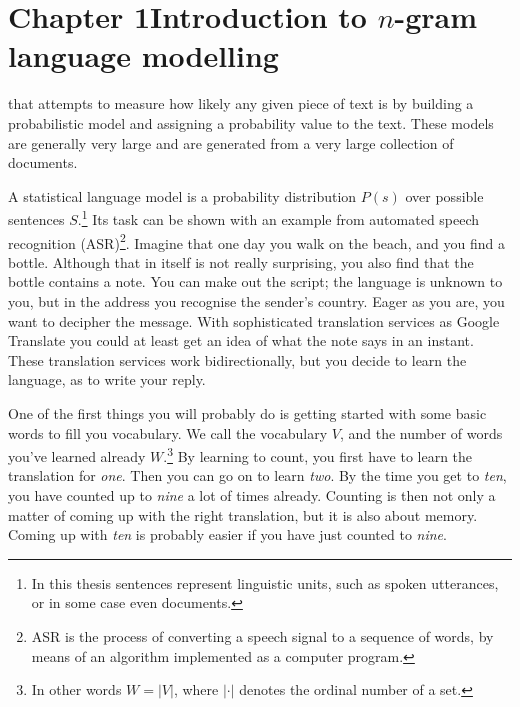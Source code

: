 \chapter{Chapter 1\newline Introduction to $n$-gram language modelling}\label{chap:introlm}

 that attempts to measure how likely any given piece of text is by building a probabilistic model and assigning a probability value to the text. These models are generally very large and are generated from a very large collection of documents.

A statistical language model is a probability distribution $P(s)$ over possible sentences $S$.\footnote{In this thesis sentences represent linguistic units, such as spoken utterances, or in some case even documents.} Its task can be shown with an example from automated speech recognition (ASR)\footnote{ASR is the process of converting a speech signal to a sequence of words, by means of an algorithm implemented as a computer program.}. Imagine that one day you walk on the beach, and you find a bottle. Although that in itself is not really surprising, you also find that the bottle contains a note. You can make out the script; the language is unknown to you, but in the address you recognise the sender's country. Eager as you are, you want to decipher the message. With sophisticated translation services as Google Translate you could at least get an idea of what the note says in an instant. These translation services work bidirectionally, but you decide to learn the language, as to write your reply.

One of the first things you will probably do is getting started with some basic words to fill you vocabulary. We call the vocabulary $V$, and the number of words you've learned already $W$.\footnote{In other words $W=|V|$, where $|\cdot|$ denotes the ordinal number of a set.} By learning to count, you first have to learn the translation for \emph{one}. Then you can go on to learn \emph{two}. By the time you get to \emph{ten}, you have counted up to \emph{nine} a lot of times already. Counting is then not only a matter of coming up with the right translation, but it is also about memory. Coming up with \emph{ten} is probably easier if you have just counted to \emph{nine}.

